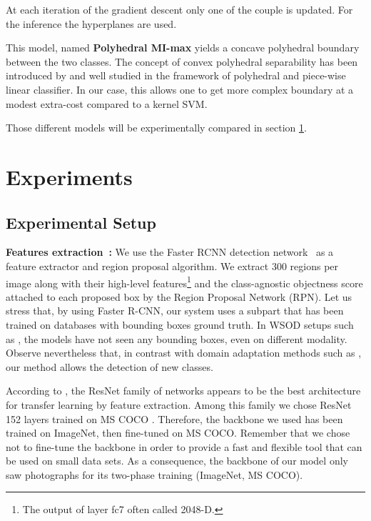 \documentclass[preprint]{elsarticle}
\newcommand\MaxOfMaxS{Polyhedral MI-max}
\begin{document}
At each iteration of the gradient descent only one of the couple  is updated. For the inference the  hyperplanes are used. 

This model, named \textbf{\MaxOfMaxS{}} yields a concave polyhedral boundary between the two classes.  The concept of convex polyhedral separability has been introduced by \cite{megiddo_complexity_1988} and well studied in the framework of polyhedral and piece-wise linear classifier. In our case, this allows one to get more complex boundary at a modest extra-cost compared to a kernel SVM. 

Those different models will be experimentally compared in section \ref{sec:experiments}. 


\section{Experiments}
\label{sec:experiments}

\subsection{Experimental Setup}

{\bf Features extraction~:}
We use the Faster RCNN  detection network~\cite{ren_faster_2015} as a feature extractor and region proposal algorithm. We extract 300 regions per image along with their high-level features\footnote{The output of layer fc7 often called 2048-D.} and the class-agnostic objectness score attached to each proposed box by the Region Proposal Network (RPN). Let us stress that, by using Faster R-CNN, our system uses a subpart that has been trained on databases with bounding boxes ground truth. In WSOD setups such as \cite{bilen_weakly_2016,zhu_soft_2017,tang_pcl_2018}, the models have not seen any bounding boxes, even on different modality. Observe nevertheless that, in contrast with domain adaptation methods such as \cite{inoue_crossdomain_2018}, our method allows the detection of new classes. 






According to \cite{kornblith_better_2018}, the ResNet family of networks appears to be the best architecture for transfer learning by feature extraction. Among this family we chose ResNet 152 layers trained on MS COCO \cite{lin_microsoft_2014}. Therefore, the backbone we used has been trained on ImageNet, then fine-tuned on MS COCO. Remember that we chose not to fine-tune the backbone in order to provide a fast and flexible tool that can be used on small data sets. As a consequence, the backbone of our model only saw photographs for its two-phase training (ImageNet, MS COCO).
\end{document}
